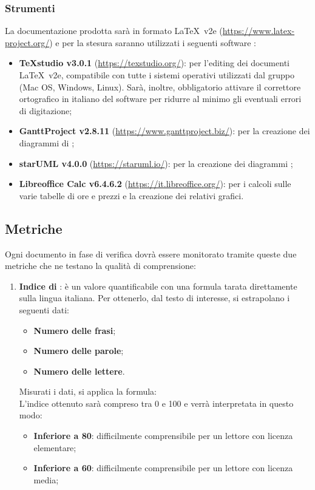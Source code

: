 	\subsubsection{Strumenti}
	La documentazione prodotta sarà in formato \LaTeX\ v2e (\url{https://www.latex-project.org/}) e per la stesura saranno utilizzati i seguenti software :
	\begin{itemize}
		\item \textbf{TeXstudio v3.0.1} (\url{https://texstudio.org/}): per l'editing dei documenti \LaTeX\ v2e, compatibile con tutte i sistemi operativi utilizzati dal gruppo (Mac OS, Windows, Linux). Sarà, inoltre, obbligatorio attivare il correttore ortografico in italiano del software per ridurre al minimo gli eventuali errori di digitazione;
		\item \textbf{GanttProject v2.8.11} (\url{https://www.ganttproject.biz/}): per la creazione dei diagrammi di ;
		\item \textbf{starUML v4.0.0} (\url{https://staruml.io/}): per la creazione dei diagrammi ;
		\item \textbf{Libreoffice Calc v6.4.6.2} (\url{https://it.libreoffice.org/}): per i calcoli sulle varie tabelle di ore  e prezzi e la creazione dei relativi grafici.
	\end{itemize}

	\subsection{Metriche}
	Ogni documento in fase di verifica dovrà essere monitorato tramite queste due metriche che ne testano la qualità di comprensione:
	\begin{enumerate}
		\item \textbf{Indice di }: è un valore quantificabile con una formula tarata direttamente sulla lingua italiana. Per ottenerlo, dal testo di interesse, si estrapolano i seguenti dati:
		\begin{itemize}
			\item \textbf{Numero delle frasi};
			\item \textbf{Numero delle parole};
			\item \textbf{Numero delle lettere}.
		\end{itemize}
		Misurati i dati, si applica la formula:\\
		L'indice ottenuto sarà compreso tra 0 e 100 e verrà interpretata in questo modo:
		\begin{itemize}
			\item \textbf{Inferiore a 80}: difficilmente comprensibile per un lettore con licenza elementare;
			\item \textbf{Inferiore a 60}: difficilmente comprensibile per un lettore con licenza media;
		\end{itemize}
	\end{enumerate}